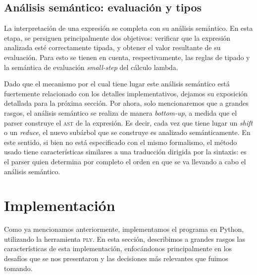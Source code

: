 \documentclass[11pt]{article}
\begin{document}

\subsection{Análisis semántico: evaluación y tipos}

La interpretación de una expresión se completa con su análisis semántico.
En esta etapa, se persiguen principalmente dos objetivos: verificar que la
expresión analizada esté correctamente tipada, y obtener el valor resultante
de su evaluación. Para esto se tienen en cuenta, respectivamente, las reglas
de tipado y la semántica de evaluación \emph{small-step} del cálculo lambda.

Dado que el mecanismo por el cual tiene lugar este análisis
semántico está fuertemente relacionado con los detalles implementativos,
dejamos su exposición detallada para la próxima sección.
Por ahora, solo mencionaremos que a grandes rasgos, el análisis semántico se
realiza de manera \emph{bottom-up}, a medida que el parser construye el
\textsc{ast} de la expresión.
Es decir, cada vez que tiene lugar un \emph{shift} o un \emph{reduce},
el nuevo subárbol que se construye es analizado semánticamente.
En este sentido, si bien no está especificado con el mismo formalismo, el
método usado tiene características similares a una traducción dirigida por la
sintaxis: es el parser quien determina por completo el orden en que
se va llevando a cabo el análisis semántico.



\section{Implementación}

Como ya mencionamos anteriormente, implementamos el programa en Python,
utilizando la herramienta \textsc{ply}. En esta sección, describimos a
grandes rasgos las características de esta implementación, enfocándonos
principalmente en los desafíos que se nos presentaron y las decisiones más
relevantes que fuimos tomando.
\end{document}
